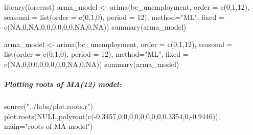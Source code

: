 \documentclass[
  letterpaper,
  DIV=11,
  numbers=noendperiod]{scrartcl}
\let\oldsubparagraph\subparagraph
\renewcommand{\subparagraph}[1]{\oldsubparagraph{#1}\mbox{}}
\newenvironment{Shaded}{\begin{snugshade}}{\end{snugshade}}
\newcommand{\AttributeTok}[1]{\textcolor[rgb]{0.40,0.45,0.13}{#1}}
\newcommand{\ConstantTok}[1]{\textcolor[rgb]{0.56,0.35,0.01}{#1}}
\newcommand{\DecValTok}[1]{\textcolor[rgb]{0.68,0.00,0.00}{#1}}
\newcommand{\FloatTok}[1]{\textcolor[rgb]{0.68,0.00,0.00}{#1}}
\newcommand{\FunctionTok}[1]{\textcolor[rgb]{0.28,0.35,0.67}{#1}}
\newcommand{\NormalTok}[1]{\textcolor[rgb]{0.00,0.23,0.31}{#1}}
\newcommand{\OtherTok}[1]{\textcolor[rgb]{0.00,0.23,0.31}{#1}}
\newcommand{\SpecialCharTok}[1]{\textcolor[rgb]{0.37,0.37,0.37}{#1}}
\newcommand{\StringTok}[1]{\textcolor[rgb]{0.13,0.47,0.30}{#1}}
\begin{document}
\begin{Shaded}
\begin{Highlighting}[]
\FunctionTok{library}\NormalTok{(forecast)}
\NormalTok{arma\_model }\OtherTok{\textless{}{-}} \FunctionTok{arima}\NormalTok{(bc\_unemployment, }\AttributeTok{order =} \FunctionTok{c}\NormalTok{(}\DecValTok{0}\NormalTok{,}\DecValTok{1}\NormalTok{,}\DecValTok{12}\NormalTok{), }\AttributeTok{seasonal =} \FunctionTok{list}\NormalTok{(}\AttributeTok{order =} \FunctionTok{c}\NormalTok{(}\DecValTok{0}\NormalTok{,}\DecValTok{1}\NormalTok{,}\DecValTok{0}\NormalTok{), }\AttributeTok{period =} \DecValTok{12}\NormalTok{), }\AttributeTok{method=}\StringTok{"ML"}\NormalTok{, }\AttributeTok{fixed =} \FunctionTok{c}\NormalTok{(}\ConstantTok{NA}\NormalTok{,}\DecValTok{0}\NormalTok{,}\ConstantTok{NA}\NormalTok{,}\DecValTok{0}\NormalTok{,}\DecValTok{0}\NormalTok{,}\DecValTok{0}\NormalTok{,}\DecValTok{0}\NormalTok{,}\DecValTok{0}\NormalTok{,}\DecValTok{0}\NormalTok{,}\ConstantTok{NA}\NormalTok{,}\DecValTok{0}\NormalTok{,}\ConstantTok{NA}\NormalTok{))}
\FunctionTok{summary}\NormalTok{(arma\_model)}

\NormalTok{arma\_model }\OtherTok{\textless{}{-}} \FunctionTok{arima}\NormalTok{(bc\_unemployment, }\AttributeTok{order =} \FunctionTok{c}\NormalTok{(}\DecValTok{0}\NormalTok{,}\DecValTok{1}\NormalTok{,}\DecValTok{12}\NormalTok{), }\AttributeTok{seasonal =} \FunctionTok{list}\NormalTok{(}\AttributeTok{order =} \FunctionTok{c}\NormalTok{(}\DecValTok{0}\NormalTok{,}\DecValTok{1}\NormalTok{,}\DecValTok{0}\NormalTok{), }\AttributeTok{period =} \DecValTok{12}\NormalTok{), }\AttributeTok{method=}\StringTok{"ML"}\NormalTok{, }\AttributeTok{fixed =} \FunctionTok{c}\NormalTok{(}\ConstantTok{NA}\NormalTok{,}\DecValTok{0}\NormalTok{,}\DecValTok{0}\NormalTok{,}\DecValTok{0}\NormalTok{,}\DecValTok{0}\NormalTok{,}\DecValTok{0}\NormalTok{,}\DecValTok{0}\NormalTok{,}\DecValTok{0}\NormalTok{,}\DecValTok{0}\NormalTok{,}\ConstantTok{NA}\NormalTok{,}\DecValTok{0}\NormalTok{,}\ConstantTok{NA}\NormalTok{))}
\FunctionTok{summary}\NormalTok{(arma\_model)}
\end{Highlighting}
\end{Shaded}

\hypertarget{plotting-roots-of-ma12-model}{%
\subparagraph{Plotting roots of MA(12)
model:}\label{plotting-roots-of-ma12-model}}

\begin{Shaded}
\begin{Highlighting}[]
\FunctionTok{source}\NormalTok{(}\StringTok{"../labs/plot.roots.r"}\NormalTok{)}
\FunctionTok{plot.roots}\NormalTok{(}\ConstantTok{NULL}\NormalTok{,}\FunctionTok{polyroot}\NormalTok{(}\FunctionTok{c}\NormalTok{(}\SpecialCharTok{{-}}\FloatTok{0.3457}\NormalTok{,}\DecValTok{0}\NormalTok{,}\DecValTok{0}\NormalTok{,}\DecValTok{0}\NormalTok{,}\DecValTok{0}\NormalTok{,}\DecValTok{0}\NormalTok{,}\DecValTok{0}\NormalTok{,}\DecValTok{0}\NormalTok{,}\DecValTok{0}\NormalTok{,}\FloatTok{0.3354}\NormalTok{,}\DecValTok{0}\NormalTok{,}\SpecialCharTok{{-}}\FloatTok{0.9446}\NormalTok{)), }\AttributeTok{main=}\StringTok{"roots of MA model"}\NormalTok{)}
\end{Highlighting}
\end{Shaded}
\end{document}
